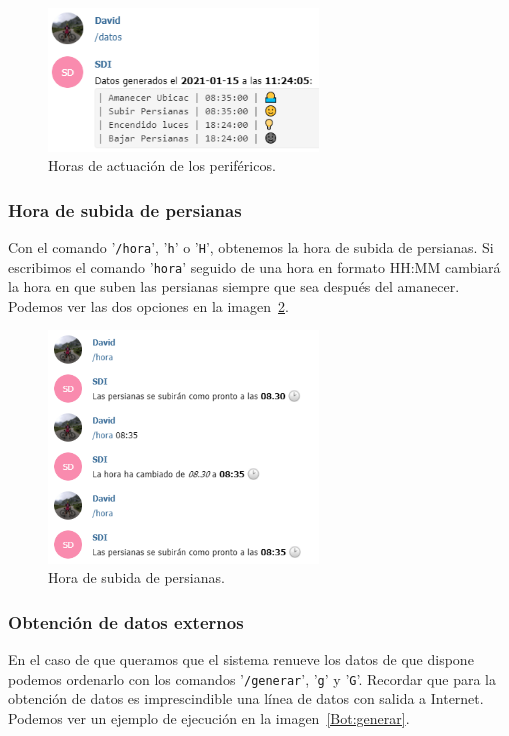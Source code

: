 \begin{figure}[h]
\centering
\includegraphics[width=0.64\textwidth]{img/SalidasBot/info.PNG}
\caption{Horas de actuación de los periféricos.}\label{Bot:Datos}
\end{figure}


\subsubsection{Hora de subida de persianas}
Con el comando '\texttt{/hora}', '\texttt{h}' o '\texttt{H}', obtenemos la hora de subida de persianas. Si escribimos el comando '\texttt{hora}' seguido de una hora en formato HH:MM cambiará la hora en que suben las persianas siempre que sea después del amanecer.
Podemos ver las dos opciones en la imagen~\ref{Bot:horaPersianas}.

\begin{figure}[h]
\centering
\includegraphics[width=0.64\textwidth]{img/SalidasBot/horaPersianas.PNG}
\caption{Hora de subida de persianas.}\label{Bot:horaPersianas}
\end{figure}



\subsubsection{Obtención de datos externos}
En el caso de que queramos que el sistema renueve los datos de que dispone podemos ordenarlo con los comandos '\texttt{/generar}', '\texttt{g}' y '\texttt{G}'. Recordar que para la obtención de datos es imprescindible una línea de datos con salida a Internet. Podemos ver un ejemplo de ejecución en la imagen~\ref{Bot:generar}.

